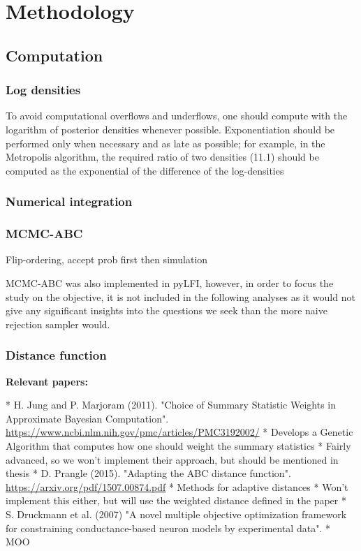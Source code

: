 \chapter{Methodology}\label{chap:methodology}

\section{Computation}

\subsection{Log densities}

To avoid computational overflows and underflows, one should compute with the logarithm of posterior densities whenever possible. Exponentiation should be performed only when necessary and as late as possible; for example, in the Metropolis algorithm, the required ratio of two densities (11.1) should be computed as the exponential of the difference of the log-densities \cite[p. 261]{BDA}

\subsection{Numerical integration} 


\subsection{MCMC-ABC}

Flip-ordering, accept prob first then simulation

MCMC-ABC was also implemented in pyLFI, however, in order to focus the study on the objective, it is not included in the following analyses as it would not give any significant insights into the questions we seek than the more naive rejection sampler would. 


\subsection{Distance function}

\textbf{Relevant papers:}

* H. Jung and P. Marjoram (2011). "Choice of Summary Statistic Weights in Approximate Bayesian Computation". \url{https://www.ncbi.nlm.nih.gov/pmc/articles/PMC3192002/}
    * Develops a Genetic Algorithm that computes how one should weight the summary statistics 
    * Fairly advanced, so we won't implement their approach, but should be mentioned in thesis
* D. Prangle (2015). "Adapting the ABC distance function". \url{https://arxiv.org/pdf/1507.00874.pdf}
    * Methods for adaptive distances
    * Won't implement this either, but will use the weighted distance defined in the paper
* S. Druckmann et al. (2007) "A novel multiple objective optimization framework for constraining conductance-based neuron models by experimental data". 
    * MOO
    

